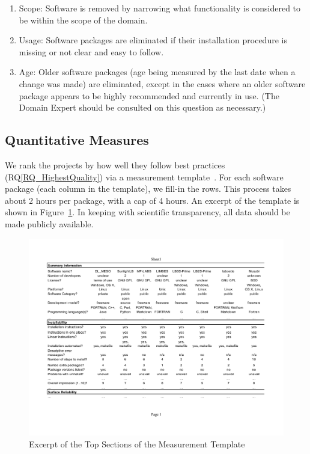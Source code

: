\documentclass[runningheads]{llncs}
\newcommand{\rqref}[1]{RQ\ref{#1}}
\begin{document}
\begin{enumerate}
	\item Scope: Software is removed by narrowing what functionality is
	considered to be within the scope of the domain.
	\item Usage: Software packages are eliminated if their installation
	procedure is missing or not clear and easy to follow.
	\item Age: Older software packages (age being measured by the last date
	when a change was made) are eliminated, except in the cases where an older
	software package appears to be highly recommended and currently in use. (The
	Domain Expert should be consulted on this question as necessary.)
\end{enumerate}

\subsection{Quantitative Measures} \label{empiricalmeasures}

We rank the projects by how well they follow best practices
(\rqref{RQ_HighestQuality}) via a measurement template~\cite{SmithEtAl2021}. For
each software package (each column in the template), we fill-in the rows. This
process takes about 2 hours per package, with a cap of 4 hours.  An excerpt of
the template is shown in Figure~\ref{measurement_template_image}.  In keeping
with scientific transparency, all data should be made publicly available.

\begin{figure}[!ht]
	\begin{center}
	  \includegraphics[width=1.0\textwidth]{./figures/measurement_template.pdf}
	  \caption{Excerpt of the Top Sections of the Measurement Template}
	  \label{measurement_template_image}
	\end{center}
\end{figure}
\end{document}
